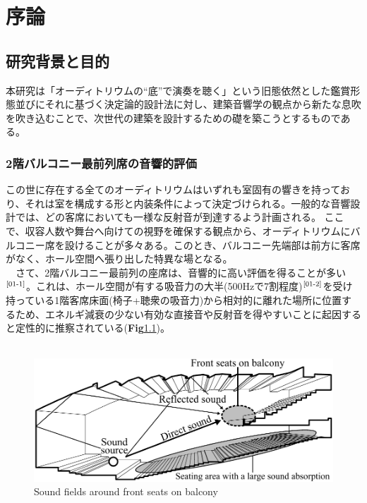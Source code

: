 \chapter{序論}
\thispagestyle{fancy}
\nobreak
\section{研究背景と目的}
本研究は「オーディトリウムの“底”で演奏を聴く」という旧態依然とした鑑賞形態並びにそれに基づく決定論的設計法に対し、建築音響学の観点から新たな息吹を吹き込むことで、次世代の建築を設計するための礎を築こうとするものである。

\subsection{2階バルコニー最前列席の音響的評価}
この世に存在する全てのオーディトリウムはいずれも室固有の響きを持っており、それは室を構成する形と内装条件によって決定づけられる。一般的な音響設計では、どの客席においても一様な反射音が到達するよう計画される。
ここで、収容人数や舞台へ向けての視野を確保する観点から、オーディトリウムにバルコニー席を設けることが多々ある。このとき、バルコニー先端部は前方に客席がなく、ホール空間へ張り出した特異な場となる。
\\　さて、2階バルコニー最前列の座席は、音響的に高い評価を得ることが多い$^{\text{\cite{01-1}}}$。これは、ホール空間が有する吸音力の大半(500Hzで7割程度)$^{\text{\cite{01-2}}}$を受け持っている1階客席床面(椅子+聴衆の吸音力)から相対的に離れた場所に位置するため、エネルギ減衰の少ない有効な直接音や反射音を得やすいことに起因すると定性的に推察されている(\textbf{Fig}\ref{fig:2階バルコニー最前列席の音場})。
\\
\\
\begin{figure}[h]
    \centering
    \includegraphics[keepaspectratio,scale=0.8]{01_att/second_balcony.pdf}
    \caption{\hspace{1mm}Sound fields around front seats on balcony}
    \label{fig:2階バルコニー最前列席の音場}
\end{figure}

